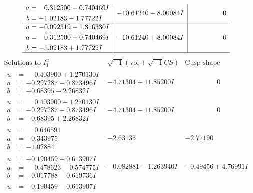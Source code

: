 \documentclass[1p]{elsarticle_modified}
\theoremstyle{definition}
\newcommand{\I}{\sqrt{-1}}
\begin{document}
$$\begin{array}{c|c|c}
\begin{aligned}
a &= \phantom{-}0.312500 - 0.740469 I \\
b &= -1.02183 - 1.77722 I\end{aligned}
 & -10.61240 - 8.00084 I & \phantom{-0.000000 } 0 \\ \hline\begin{aligned}
u &= -0.092319 - 1.316330 I \\
a &= \phantom{-}0.312500 + 0.740469 I \\
b &= -1.02183 + 1.77722 I\end{aligned}
 & -10.61240 + 8.00084 I & \phantom{-0.000000 } 0\\
 \hline 
 \end{array}$$\newpage$$\begin{array}{c|c|c}  
\text{Solutions to }I^u_{1}& \I (\text{vol} + \sqrt{-1}CS) & \text{Cusp shape}\\
 \hline 
\begin{aligned}
u &= \phantom{-}0.403900 + 1.270130 I \\
a &= -0.297287 - 0.873496 I \\
b &= -0.68395 - 2.26832 I\end{aligned}
 & -4.71304 + 11.85200 I & \phantom{-0.000000 } 0 \\ \hline\begin{aligned}
u &= \phantom{-}0.403900 - 1.270130 I \\
a &= -0.297287 + 0.873496 I \\
b &= -0.68395 + 2.26832 I\end{aligned}
 & -4.71304 - 11.85200 I & \phantom{-0.000000 } 0 \\ \hline\begin{aligned}
u &= \phantom{-}0.646591\phantom{ +0.000000I} \\
a &= -0.343975\phantom{ +0.000000I} \\
b &= -1.02884\phantom{ +0.000000I}\end{aligned}
 & -2.63135\phantom{ +0.000000I} & -2.77190\phantom{ +0.000000I} \\ \hline\begin{aligned}
u &= -0.190459 + 0.613907 I \\
a &= \phantom{-}0.478623 - 0.574775 I \\
b &= -0.017788 - 0.619736 I\end{aligned}
 & -0.082881 - 1.263940 I & -0.49456 + 4.76991 I \\ \hline\begin{aligned}
u &= -0.190459 - 0.613907 I \\

\end{aligned}
\end{array}$$
\end{document}
